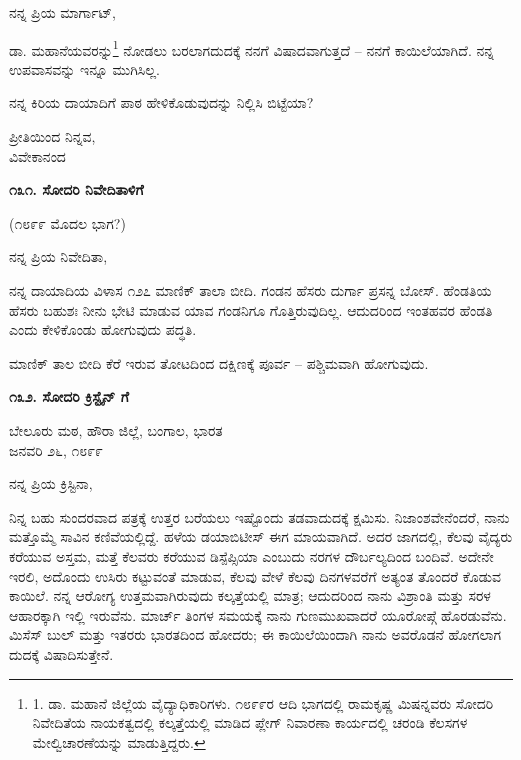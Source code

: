 ನನ್ನ ಪ್ರಿಯ ಮಾರ್ಗಾಟ್,

ಡಾ. ಮಹಾನೆಯವರನ್ನು\footnote{1. ಡಾ. ಮಹಾನೆ ಜಿಲ್ಲೆಯ ವೈದ್ಯಾಧಿಕಾರಿಗಳು. ೧೮೯೯ರ ಆದಿ ಭಾಗದಲ್ಲಿ ರಾಮಕೃಷ್ಣ ಮಿಷನ್ನವರು ಸೋದರಿ ನಿವೇದಿತೆಯ ನಾಯಕತ್ವದಲ್ಲಿ ಕಲ್ಕತ್ತೆಯಲ್ಲಿ ಮಾಡಿದ ಪ್ಲೇಗ್ ನಿವಾರಣಾ ಕಾರ್ಯದಲ್ಲಿ ಚರಂಡಿ ಕೆಲಸಗಳ ಮೇಲ್ವಿಚಾರಣೆಯನ್ನು ಮಾಡುತ್ತಿದ್ದರು.} ನೋಡಲು ಬರಲಾಗದುದಕ್ಕೆ ನನಗೆ ವಿಷಾದವಾಗುತ್ತದೆ – ನನಗೆ ಕಾಯಿಲೆಯಾಗಿದೆ. ನನ್ನ ಉಪವಾಸವನ್ನು ಇನ್ನೂ ಮುಗಿಸಿಲ್ಲ.

ನನ್ನ ಕಿರಿಯ ದಾಯಾದಿಗೆ ಪಾಠ ಹೇಳಿಕೊಡುವುದನ್ನು ನಿಲ್ಲಿಸಿ ಬಿಟ್ಟೆಯಾ?

\begin{flushright}
ಪ್ರೀತಿಯಿಂದ ನಿನ್ನವ,\\ವಿವೇಕಾನಂದ
\end{flushright}

\begin{center}
\textbf{೧೩೧. ಸೋದರಿ ನಿವೇದಿತಾಳಿಗೆ}
\end{center}

\begin{flushright}
(೧೮೯೯ ಮೊದಲ ಭಾಗ?)
\end{flushright}

ನನ್ನ ಪ್ರಿಯ ನಿವೇದಿತಾ,

ನನ್ನ ದಾಯಾದಿಯ ವಿಳಾಸ ೧೨೭ ಮಾಣಿಕ್ ತಾಲಾ ಬೀದಿ. ಗಂಡನ ಹೆಸರು ದುರ್ಗಾ ಪ್ರಸನ್ನ ಬೋಸ್. ಹೆಂಡತಿಯ ಹೆಸರು ಬಹುಶಃ ನೀನು ಭೇಟಿ ಮಾಡುವ ಯಾವ ಗಂಡನಿಗೂ ಗೊತ್ತಿರುವುದಿಲ್ಲ. ಆದುದರಿಂದ ಇಂತಹವರ ಹೆಂಡತಿ ಎಂದು ಕೇಳಿಕೊಂಡು ಹೋಗುವುದು ಪದ್ಧತಿ.

ಮಾಣಿಕ್ ತಾಲ ಬೀದಿ ಕೆರೆ ಇರುವ ತೋಟದಿಂದ ದಕ್ಷಿಣಕ್ಕೆ ಪೂರ್ವ – ಪಶ್ಚಿಮವಾಗಿ ಹೋಗುವುದು.

\begin{center}
\textbf{೧೩೨. ಸೋದರಿ ಕ್ರಿಸ್ಟೈನ್ ಗೆ}
\end{center}

\begin{flushright}
ಬೇಲೂರು ಮಠ, ಹೌರಾ ಜಿಲ್ಲೆ, ಬಂಗಾಲ, ಭಾರತ\\ಜನವರಿ ೨೬, ೧೮೯೯
\end{flushright}

ನನ್ನ ಪ್ರಿಯ ಕ್ರಿಸ್ಟಿನಾ,

ನಿನ್ನ ಬಹು ಸುಂದರವಾದ ಪತ್ರಕ್ಕೆ ಉತ್ತರ ಬರೆಯಲು ಇಷ್ಟೊಂದು ತಡವಾದುದಕ್ಕೆ ಕ್ಷಮಿಸು. ನಿಜಾಂಶವೇನೆಂದರೆ, ನಾನು ಮತ್ತೊಮ್ಮೆ ಸಾವಿನ ಕಣಿವೆಯಲ್ಲಿದ್ದೆ. ಹಳೆಯ ಡಯಾಬಿಟೀಸ್ ಈಗ ಮಾಯವಾಗಿದೆ. ಅದರ ಜಾಗದಲ್ಲಿ, ಕೆಲವು ವೈದ್ಯರು ಕರೆಯುವ ಅಸ್ತಮ, ಮತ್ತೆ ಕೆಲವರು ಕರೆಯುವ ಡಿಸ್ಪೆಪ್ಸಿಯಾ ಎಂಬುದು ನರಗಳ ದೌರ್ಬಲ್ಯದಿಂದ ಬಂದಿವೆ. ಅದೇನೇ ಇರಲಿ, ಅದೊಂದು ಉಸಿರು ಕಟ್ಟುವಂತೆ ಮಾಡುವ, ಕೆಲವು ವೇಳೆ ಕೆಲವು ದಿನಗಳವರೆಗೆ ಅತ್ಯಂತ ತೊಂದರೆ ಕೊಡುವ ಕಾಯಿಲೆ. ನನ್ನ ಆರೋಗ್ಯ ಉತ್ತಮವಾಗಿರುವುದು ಕಲ್ಕತ್ತೆಯಲ್ಲಿ ಮಾತ್ರ; ಆದುದರಿಂದ ನಾನು ವಿಶ್ರಾಂತಿ ಮತ್ತು ಸರಳ ಆಹಾರಕ್ಕಾಗಿ ಇಲ್ಲಿ ಇರುವೆನು. ಮಾರ್ಚ್ ತಿಂಗಳ ಸಮಯಕ್ಕೆ ನಾನು ಗುಣಮುಖವಾದರೆ ಯೂರೋಪ್ಗೆ ಹೊರಡುವೆನು. ಮಿಸೆಸ್ ಬುಲ್ ಮತ್ತು ಇತರರು ಭಾರತದಿಂದ ಹೋದರು; ಈ ಕಾಯಿಲೆಯಿಂದಾಗಿ ನಾನು ಅವರೊಡನೆ ಹೋಗಲಾಗ ದುದಕ್ಕೆ ವಿಷಾದಿಸುತ್ತೇನೆ.

